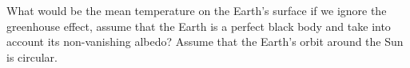 What would be the mean temperature on the Earth's surface if we ignore the
greenhouse effect, assume that the Earth is a perfect black body and take into
account its non-vanishing albedo? Assume that the Earth's orbit around the Sun
is circular.
